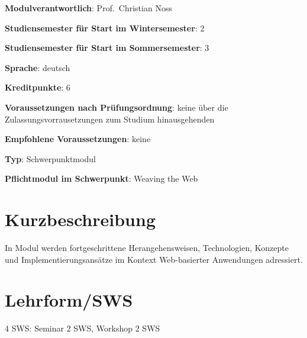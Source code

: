 \begin{modulHead}
\textbf{Modulverantwortlich}: Prof.~Christian
Noss
\end{modulHead}
\begin{modulHead}
\textbf{Studiensemester für
Start im Wintersemester}:
2
\end{modulHead}
\begin{modulHead}
\textbf{Studiensemester für Start
im Sommersemester}:
3
\end{modulHead}
\begin{modulHead}
\textbf{Sprache}:
deutsch
\end{modulHead}
\begin{modulHead}
\textbf{Kreditpunkte}:
6
\end{modulHead}
\begin{modulHead}
\textbf{Voraussetzungen nach
Prüfungsordnung}: keine über die Zulassungsvorrausetzungen zum Studium
hinausgehenden
\end{modulHead}
\begin{modulHead}
\textbf{Empfohlene
Voraussetzungen}: keine
\end{modulHead}
\begin{modulHead}
\textbf{Typ}:
Schwerpunktmodul
\end{modulHead}
\begin{modulHead}
\textbf{Pflichtmodul
im Schwerpunkt}: Weaving the Web
\end{modulHead}


\section*{Kurzbeschreibung\label{/mi-2017/modulbeschreibungen-master/MA_WTW_Modul_Web-Technologien}}\label{kurzbeschreibungpathlabelmi-2017modulbeschreibungen-mastermaux5fwtwux5fmodulux5fweb-technologien}

In Modul werden fortgeschrittene Herangehensweisen, Technologien,
Konzepte und Implementierungsansätze im Kontext Web-basierter
Anwendungen adressiert.

\section*{Lehrform/SWS
\label{/mi-2017/modulbeschreibungen-master/MA_WTW_Modul_Web-Technologien}}\label{lehrformsws-pathlabelmi-2017modulbeschreibungen-mastermaux5fwtwux5fmodulux5fweb-technologien}

4 SWS: Seminar 2 SWS, Workshop 2 SWS

